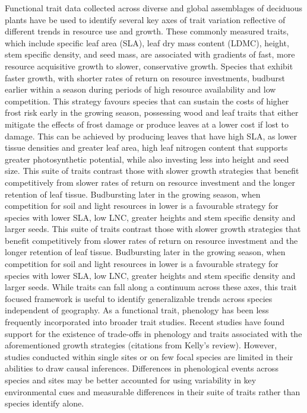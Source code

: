 \documentclass{article}\usepackage[]{graphicx}\usepackage[]{color}
\begin{document}
Functional trait data collected across diverse and global assemblages of deciduous plants have be used to identify several key axes of trait variation reflective of different trends in resource use and growth. These commonly measured traits, which include specific leaf area (SLA), leaf dry mass content (LDMC), height, stem specific density, and seed mass, are associated with gradients of fast, more resource acquisitive growth to slower, conservative growth. Species that exhibit faster growth, with shorter rates of return on resource investments, budburst earlier within a season during periods of high resource availability and low competition. This strategy favours species that can sustain the costs of higher frost risk early in the growing season, possessing wood and leaf traits that either mitigate the effects of frost damage or produce leaves at a lower cost if lost to damage. This can be achieved by producing leaves that have high SLA, as lower tissue densities and greater leaf area, high leaf nitrogen content that supports greater photosynthetic potential, while also investing less into height and seed size. This suite of traits contrast those with slower growth strategies that benefit competitively from slower rates of return on resource investment and the longer retention of leaf tissue. Budbursting later in the growing season, when competition for soil and light resources in lower is a favourable strategy for species with lower SLA, low LNC, greater heights and stem specific density and larger seeds. This suite of traits contrast those with slower growth strategies that benefit competitively from slower rates of return on resource investment and the longer retention of leaf tissue. Budbursting later in the growing season, when competition for soil and light resources in lower is a favourable strategy for species with lower SLA, low LNC, greater heights and stem specific density and larger seeds. While traits can fall along a continuum across these axes, this trait focused framework is useful to identify generalizable trends across species independent of geography. As a functional trait, phenology has been less frequently incorporated into broader trait studies. Recent studies have found support for the existence of trade-offs in phenology and traits associated with the aforementioned growth strategies (citations from Kelly's review). However, studies conducted within single sites or on few focal species are limited in their abilities to draw causal inferences. Differences in phenological events across species and sites may be better accounted for using variability in key environmental cues and measurable differences in their suite of traits rather than species identify alone. %
\end{document}
